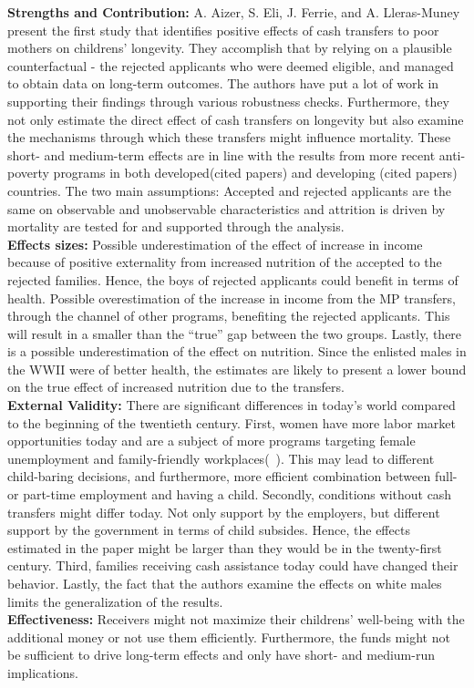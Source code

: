 \textbf{Strengths and Contribution:} A. Aizer, S. Eli, J. Ferrie, and A. Lleras-Muney present the first study that identifies positive effects of cash transfers to poor mothers on childrens' longevity. They accomplish that by relying on a plausible counterfactual - the rejected applicants who were deemed eligible, and managed to obtain data on long-term outcomes. The authors have put a lot of work in supporting their findings through various robustness checks. Furthermore, they not only estimate the direct effect of cash transfers on longevity but also examine the mechanisms through which these transfers might influence mortality. These short- and medium-term effects are in line with the results from more recent anti-poverty programs in both developed(cited papers) and developing (cited papers) countries. The two main assumptions: Accepted and rejected applicants are the same on observable and unobservable characteristics and attrition is driven by mortality are tested for and supported through the analysis.   \\
\textbf{Effects sizes:} Possible underestimation of the effect of increase in income because of positive
externality from increased nutrition of the accepted to the rejected families. Hence, the boys of rejected applicants could benefit in terms of health. Possible overestimation of the increase in income from the MP transfers, through the channel of other programs, benefiting the rejected applicants. This will result in a smaller than the ``true'' gap between the two groups. Lastly, there is a possible underestimation of the effect on nutrition. Since the enlisted males in the WWII were of better health, the estimates are likely to present a lower bound on the true effect of increased nutrition due to the transfers. \\
\textbf{External Validity:} There are significant differences in today's world compared to the beginning of the twentieth century. First, women have more labor market opportunities today and are a subject of more programs targeting female unemployment and family-friendly workplaces(~\citep{lauber2016helping}). This may lead to different child-baring decisions, and furthermore, more efficient combination between full- or part-time employment and having a child. Secondly, conditions without cash transfers might differ today. Not only support by the employers, but different support by the government in terms of child subsides. Hence, the effects estimated in the paper might be larger than they would be in the twenty-first century. Third, families receiving cash assistance today could have changed their behavior. Lastly, the fact that the authors examine the effects on white males limits the generalization of the results.\\   
\textbf{Effectiveness:} Receivers might not maximize their childrens' well-being with the additional money or not use them efficiently. Furthermore, the funds might not be sufficient to drive long-term effects and only have short- and medium-run implications. 